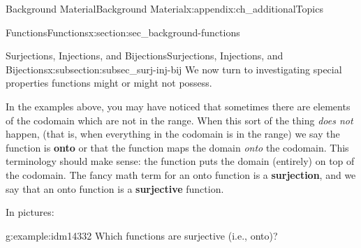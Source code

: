\documentclass[oneside,10pt,]{book}
\newcommand{\terminology}[1]{\textbf{#1}}
\numberwithin{equation}{chapter}
\begin{document}
\begin{appendixptx}{Background Material}{}{Background Material}{}{}{x:appendix:ch_additionalTopics}
\begin{sectionptx}{Functions}{}{Functions}{}{}{x:section:sec_background-functions}
\typeout{************************************************}
%
\begin{subsectionptx}{Surjections, Injections, and Bijections}{}{Surjections, Injections, and Bijections}{}{}{x:subsection:subsec_surj-inj-bij}
We now turn to investigating special properties functions might or might not possess.%
\par
In the examples above, you may have noticed that sometimes there are elements of the codomain which are not in the range. When this sort of the thing \emph{does not} happen, (that is, when everything in the codomain is in the range) we say the function is \terminology{onto} or that the function maps the domain \emph{onto} the codomain. This terminology should make sense: the function puts the domain (entirely) on top of the codomain. The fancy math term for an onto function is a \terminology{surjection}, and we say that an onto function is a \terminology{surjective} function.%
\par
In pictures:%
\begin{sidebyside}{2}{0.1}{0.1}{0.2}%
\begin{sbspanel}{0.3}%
%
\end{sbspanel}%
\begin{sbspanel}{0.3}%
%
\end{sbspanel}%
\end{sidebyside}%
\begin{example}{}{g:example:idm14332}%
Which functions are surjective (i.e., onto)?%

\end{example}
\end{subsectionptx}
\end{sectionptx}
\end{appendixptx}
\end{document}
